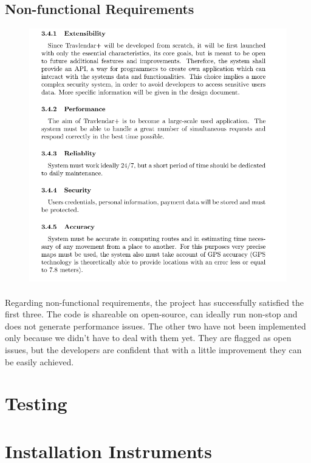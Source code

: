 \documentclass{article}
\begin{document}
		\subsection{Non-functional Requirements}
			\begin{figure}[H]
			\includegraphics[width=\linewidth]{Images/Goals/Non-functional_requirements.png}
			\label{fig:G8}
			\end{figure}
		\paragraph{}Regarding non-functional requirements, the project has successfully satisfied the first three. The code is shareable on open-source, can ideally run non-stop and does not generate performance issues. The other two have not been implemented only because we didn't have to deal with them yet. They are flagged as open issues, but the developers are confident that with a little improvement they can be easily achieved.
\newpage
	\section{Testing}
\newpage
	\section{Installation Instruments}
\newpage
\end{document}
